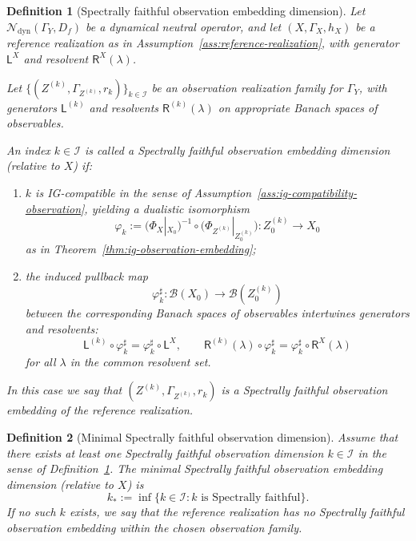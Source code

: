 \documentclass[11pt]{article}
\newtheorem{definition}{Definition}
\begin{document}
\begin{definition}[Spectrally faithful observation embedding dimension]
\label{def:spectrally-faithful-observation-dimension}
Let $\mathcal N_{\mathrm{dyn}}(\Gamma_Y,D_f)$ be a dynamical neutral
operator, and let $(X,\Gamma_X,h_X)$ be a reference realization as in
Assumption~\ref{ass:reference-realization}, with generator $\mathsf L^X$
and resolvent $\mathsf R^X(\lambda)$.

Let $\{(Z^{(k)},\Gamma_{Z^{(k)}},r_k)\}_{k\in\mathcal I}$ be an
observation realization family for $\Gamma_Y$, with generators
$\mathsf L^{(k)}$ and resolvents $\mathsf R^{(k)}(\lambda)$ on
appropriate Banach spaces of observables.

An index $k\in\mathcal I$ is called a \emph{Spectrally faithful
observation embedding dimension} (relative to $X$) if:
\begin{enumerate}[label=(SC\arabic*),leftmargin=1.8em]
  \item $k$ is IG-compatible in the sense of
  Assumption~\ref{ass:ig-compatibility-observation}, yielding a
  dualistic isomorphism
  \[
    \varphi_k
    :=
    \bigl(\Phi_X|_{X_0}\bigr)^{-1}
    \circ
    \bigl(\Phi_{Z^{(k)}}|_{Z^{(k)}_0}\bigr)
    : Z^{(k)}_0 \to X_0
  \]
  as in Theorem~\ref{thm:ig-observation-embedding};
  \item the induced pullback map
  \[
    \varphi_k^\sharp : \mathcal B(X_0) \to \mathcal B(Z^{(k)}_0)
  \]
  between the corresponding Banach spaces of observables intertwines
  generators and resolvents:
  \[
    \mathsf L^{(k)} \circ \varphi_k^\sharp
    = \varphi_k^\sharp \circ \mathsf L^X,
    \qquad
    \mathsf R^{(k)}(\lambda) \circ \varphi_k^\sharp
    = \varphi_k^\sharp \circ \mathsf R^X(\lambda)
  \]
  for all $\lambda$ in the common resolvent set.
\end{enumerate}
In this case we say that $(Z^{(k)},\Gamma_{Z^{(k)}},r_k)$ is a
\emph{Spectrally faithful observation embedding} of the reference
realization.
\end{definition}

\begin{definition}[Minimal Spectrally faithful observation dimension]
\label{def:minimal-spectrally-faithful-dimension}
Assume that there exists at least one Spectrally faithful observation
dimension $k\in\mathcal I$ in the sense of
Definition~\ref{def:spectrally-faithful-observation-dimension}. The
\emph{minimal Spectrally faithful observation embedding dimension}
(relative to $X$) is
\[
  k_\ast
  := \inf\{k\in\mathcal I : k
      \text{ is Spectrally faithful}\}.
\]
If no such $k$ exists, we say that the reference realization has no
Spectrally faithful observation embedding within the chosen observation
family.
\end{definition}
\end{document}
